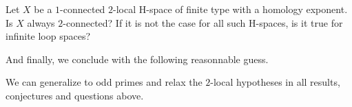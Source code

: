 \begin{quest}
Let $X$ be a $1$-connected $2$-local H-space of finite type with a homology exponent. Is $X$ always $2$-connected? If it is not the case for all such H-spaces, is it true for infinite loop spaces?
\end{quest}

\bigskip
And finally, we conclude with the following reasonnable guess.

\begin{conj}
We can generalize to odd primes and relax the $2$-local hypotheses in all results, conjectures and questions above.
\end{conj}

\endinput